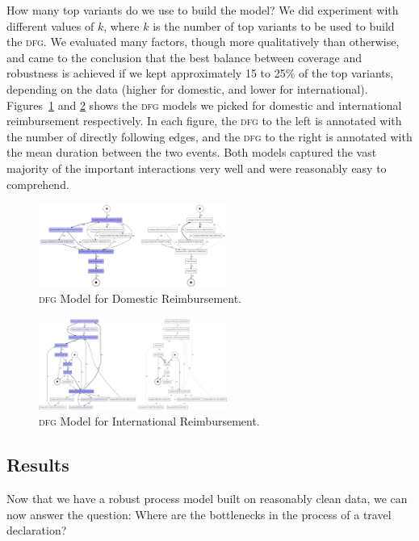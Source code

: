 \documentclass[conference]{IEEEtran}
\begin{document}
How many top variants do we use to build the model?
We did experiment with different values of $k$, where $k$ is the number of
top variants to be used to build the \textsc{dfg}. We
evaluated many factors, though more qualitatively than otherwise,
and came to the conclusion
that the best balance between coverage and robustness is achieved if
we kept approximately 15 to 25\% of the top variants, depending on the data
(higher for domestic, and lower for international). Figures~\ref{fig-domestic}
and \ref{fig-international} shows the \textsc{dfg} models we picked for
domestic and international reimbursement respectively. In each figure,
the \textsc{dfg} to the left is annotated with the number of directly following
edges, and the \textsc{dfg} to the right is annotated with the mean duration between
the two events. Both models captured the vast majority of the important
interactions very well and were reasonably easy to comprehend.

\begin{figure}[htbp]
\centerline{\includegraphics[width=0.55\textwidth]{images/domestic.png}}
\caption{\textsc{dfg} Model for Domestic Reimbursement.}
\label{fig-domestic}
\end{figure}

\begin{figure}[htbp]
\centerline{\includegraphics[width=0.55\textwidth]{images/international.png}}
\caption{\textsc{dfg} Model for International Reimbursement.}
\label{fig-international}
\end{figure}

\subsection{Results}

Now that we have a robust process model built on reasonably clean data,
we can now answer the question: 
Where are the bottlenecks in the process of a travel declaration?
\end{document}
